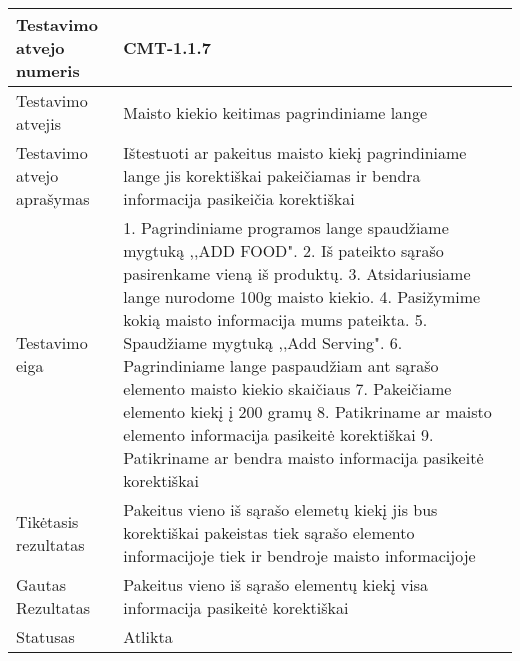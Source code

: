 \documentclass[oneside]{VUMIFPSkursinis}
\begin{document}
\begin{center}
    \begin{tabular}{ |p{5cm}|p{13cm}|}
    \hline
        Testavimo atvejo numeris & CMT-1.1.7  \\ \hline
        Testavimo atvejis & Maisto kiekio keitimas pagrindiniame lange \\ \hline
        Testavimo atvejo aprašymas & Ištestuoti ar pakeitus maisto kiekį pagrindiniame lange jis korektiškai pakeičiamas ir bendra informacija pasikeičia korektiškai \\ \hline
        Testavimo eiga &  1. Pagrindiniame programos lange spaudžiame mygtuką ,,ADD FOOD". 
				2. Iš pateikto sąrašo pasirenkame vieną iš produktų. 
				3. Atsidariusiame lange nurodome 100g maisto kiekio.
				4. Pasižymime kokią maisto informacija mums pateikta. 
				5. Spaudžiame mygtuką ,,Add Serving".
				6. Pagrindiniame lange paspaudžiam ant sąrašo elemento maisto kiekio skaičiaus
				7. Pakeičiame elemento kiekį į 200 gramų
				8. Patikriname ar maisto elemento informacija pasikeitė korektiškai
				9. Patikriname ar bendra maisto informacija pasikeitė korektiškai\\ \hline
        Tikėtasis rezultatas &  Pakeitus vieno iš sąrašo elemetų kiekį jis bus korektiškai pakeistas tiek sąrašo elemento informacijoje tiek ir bendroje maisto informacijoje \\ \hline
        Gautas Rezultatas & Pakeitus vieno iš sąrašo elementų kiekį visa informacija pasikeitė korektiškai \\ \hline
        Statusas &  Atlikta\\ \hline
    \hline
    \end{tabular}
\end{center}
\end{document}
